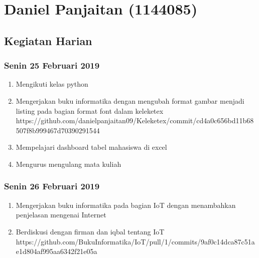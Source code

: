 \chapter{Daniel Panjaitan (1144085)}

\section{Kegiatan Harian}
\subsection{Senin 25 Februari 2019}
\begin{enumerate}
  \item Mengikuti kelas python
  \item Mengerjakan buku informatika dengan mengubah format gambar menjadi listing pada bagian format font dalam keleketex
  \subitem https://github.com/danielpanjaitan09/Keleketex/commit/cd4a0c656bd11b68507f8b999467d70390291544
  \item Mempelajari dashboard tabel mahasiswa di excel
  \item Mengurus mengulang mata kuliah
\end{enumerate} 


\subsection{Senin 26 Februari 2019}
\begin{enumerate}
  \item Mengerjakan buku informatika pada bagian IoT dengan menambahkan penjelasan mengenai Internet
  \item Berdiskusi dengan firman dan iqbal tentang IoT
  \subitem https://github.com/BukuInformatika/IoT/pull/1/commits/9af0c14dca87c51ae1d804af995aa6342f21e05a
\end{enumerate} 